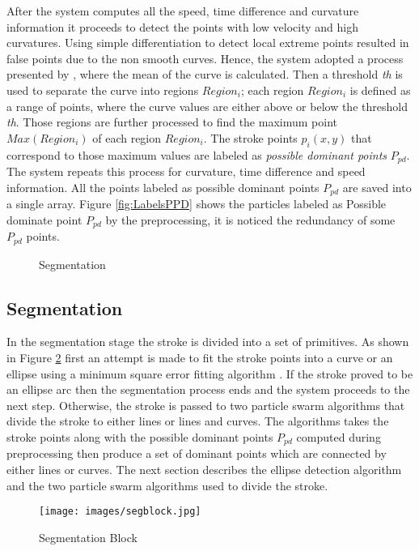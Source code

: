 \documentclass{article}
\begin{document}
After the system computes all the speed, time difference and curvature information it proceeds to detect the points with low velocity and high curvatures. Using simple differentiation to detect local extreme points resulted in false points due to the non smooth curves. Hence, the system adopted a process presented by \cite{earlyprocess}, where the mean of the curve is calculated. Then a threshold \textit{th} is used to separate the curve into regions $Region_i$; each region $Region_i$ is defined as a range of points, where the curve values are either above or below the threshold \textit{th}. Those regions are further processed to find the maximum point $Max(Region_i)$ of each region $Region_i$. The stroke points $p_i(x,y)$ that correspond to those maximum values are labeled as \textit{possible dominant points} $P_{pd}$. The system repeats this process for curvature, time difference and speed information. All the points labeled as possible dominant points $P_{pd}$ are saved into a single array. Figure \ref{fig:LabelsPPD} shows the particles labeled as Possible dominate point $P_{pd}$ by the preprocessing, it is noticed the redundancy of some $P_{pd}$ points. %
\begin{figure}
	\centering
		\hfill
	\caption{Segmentation}%
	\label{fig:pso1}
\end{figure}
\subsection{Segmentation}
\label{seg}
In the segmentation stage the stroke is divided into a set of primitives. As shown in Figure \ref{fig:segblock} first an attempt is made to fit the stroke points into a curve or an ellipse using a minimum square error fitting algorithm \cite{chernov}. If the stroke proved to be an ellipse arc then the segmentation process ends and the system proceeds to the next step. Otherwise, the stroke is passed to two particle swarm algorithms that divide the stroke to either lines or lines and curves. The algorithms takes the stroke points along with the possible dominant points $P_{pd}$ computed during preprocessing then produce a set of dominant points which are connected by either lines or curves.  The next section describes the ellipse detection algorithm and the two particle swarm algorithms used to divide the stroke.
 \begin{figure}
	\centering
		\texttt{[image: images/segblock.jpg]}
	\caption{Segmentation Block}
	\label{fig:segblock}
\end{figure}
\end{document}
